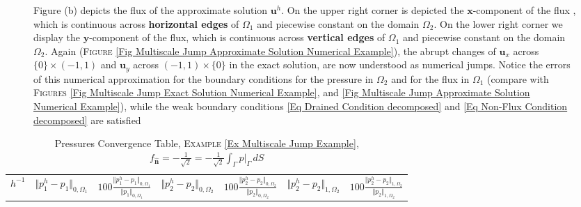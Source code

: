 \documentclass[3p]{elsarticle}
\def\u{\mathbf u}
\def\poneh{p_{1}^{h}}
\def\ptwoh{p_{2}^{h}}
\def\flux{f_{\bm{\hat{n}} } }
\def\iversor{\widehat{\boldsymbol{\imath} } }
\def\jversor{\widehat{\boldsymbol{\jmath} } }
\begin{document}
\begin{example}
\begin{figure}[h]
{	Figure (b) depicts the flux of the approximate solution $\u^{h}$. On the upper right corner is depicted the $\boldsymbol{x}$-component of the flux %
	, which is continuous across \textbf{horizontal edges} of $\Omega_{1}$ and piecewise constant on the domain $\Omega_2$.	
	On the lower right corner we display %
	the $\boldsymbol{y}$-component of the flux, which is continuous across \textbf{vertical edges} of $\Omega_{1}$ and piecewise constant on the domain $\Omega_2$. Again (\textsc{Figure} \ref{Fig Multiscale Jump Approximate Solution Numerical Example}), the abrupt changes of $ \u_{x} $ across $ \{0\}\times (-1,1) $ and $ \u_{y} $ across $ (-1,1)\times\{0\} $ 
	in the exact solution, are now understood as numerical jumps. Notice the errors of this numerical approximation for the boundary conditions for the pressure in $ \Omega_{2} $ and for the flux in $ \Omega_{1} $ (compare with \textsc{Figures} \ref{Fig Multiscale Jump Exact Solution Numerical Example}, and \ref{Fig Multiscale Jump Approximate Solution Numerical Example}), while the weak boundary conditions \eqref{Eq Drained Condition decomposed} and \eqref{Eq Non-Flux Condition decomposed} are satisfied 
	\label{Fig Multiscale Jump Error Solution Numerical Example} }
\end{figure}
%
%
\begin{table}[h!]
\caption{Pressures Convergence Table, \textsc{Example} \ref{Ex Multiscale Jump Example}, $ \flux = - \frac{1}{\sqrt{2} } =  - \frac{1}{\sqrt{2} } \int_{\Gamma} p\big\vert_{\Gamma} \, dS $ }\label{Table Mult Jump Error Pressure Approximation}
\def\arraystretch{1.4}
\begin{center}
\begin{tabular}{ c c c c c c c }
    \hline
    \rowcolor{gray!50}
$ h^{-1} $  
& $ \Vert  \poneh- p_{1}  \Vert_{ 0, \Omega_{1} } $ 
& %
$ 100 \frac{\Vert  \poneh- p_{1}  \Vert_{ 0, \Omega_{1} }}{\Vert  p_{1}  \Vert_{ 0, \Omega_{1} }} $  
& $ \Vert  \ptwoh- p_{2}  \Vert_{0, \Omega_{2} } $ 
& %
$ 100\frac{ \Vert  \ptwoh- p_{2}  \Vert_{0, \Omega_{2} } }{ \Vert   p_{2}  \Vert_{0, \Omega_{2} } } $
& $\Vert  \ptwoh- p_{2}  \Vert_{1, \Omega_{2} }$ 
& %
$ 100\frac{ \Vert  \ptwoh- p_{2}  \Vert_{1, \Omega_{2} } }{ \Vert   p_{2}  \Vert_{1, \Omega_{2} } } $ 

\end{tabular}
\end{center}
\end{table}
\end{example}
\end{document}

